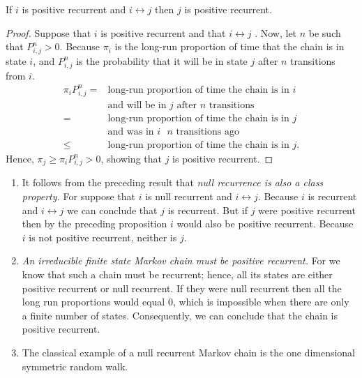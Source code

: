 \begin{proposition}\label{positive recurrence is a class property}
    If $i$ is positive recurrent and $i \leftrightarrow j$ then $j$ is positive recurrent.
    \begin{proof}
        Suppose that $i$ is positive recurrent and that $i \leftrightarrow j$ . Now, let $n$ be such that $P^n_{i,j}> 0$. Because $\pi_i$ is the long-run proportion of time that the chain is in state $i$, and $P^n_{i,j}$ is the probability that it will be in state $j$ after $n$ transitions from $i$.
        \begin{align*}
            \pi_i P^n_{i,j} = & \text{long-run proportion of time the chain is in $i$} \\ 
            &\text{and will be in $j$ after $n$ transitions} \\ 
            = & \text{long-run proportion of time the chain is in $j$}\\
            & \text{and was in $i$ $n$ transitions ago} \\ 
            \le & \text{long-run proportion of time the chain is in $j$}.
        \end{align*}
        Hence, $\pi_j \ge \pi_i P^n_{i,j} > 0$, showing that $j$ is positive recurrent.
    \end{proof}
\end{proposition}

\begin{remark}
    \begin{enumerate}
        \item It follows from the preceding result that \textit{null recurrence is also a class property.} For suppose that $i$ is null recurrent and $i \leftrightarrow j$. Because $i$ is recurrent and $i \leftrightarrow j$ we can conclude that $j$ is recurrent. But if $j$ were positive recurrent then by the preceding proposition $i$ would also be positive recurrent.
        Because $i$ is not positive recurrent, neither is $j$.
        \item \textit{An irreducible finite state Markov chain must be positive recurrent.} For we know that such a chain must be recurrent; hence, all its states are either positive recurrent or null recurrent. If they were null recurrent then all the long run proportions would equal $0$, which is impossible when there are only a finite number of states. Consequently, we can conclude that the chain is positive recurrent.
        \item The classical example of a null recurrent Markov chain is the one dimensional symmetric random walk.
    \end{enumerate}
\end{remark}

